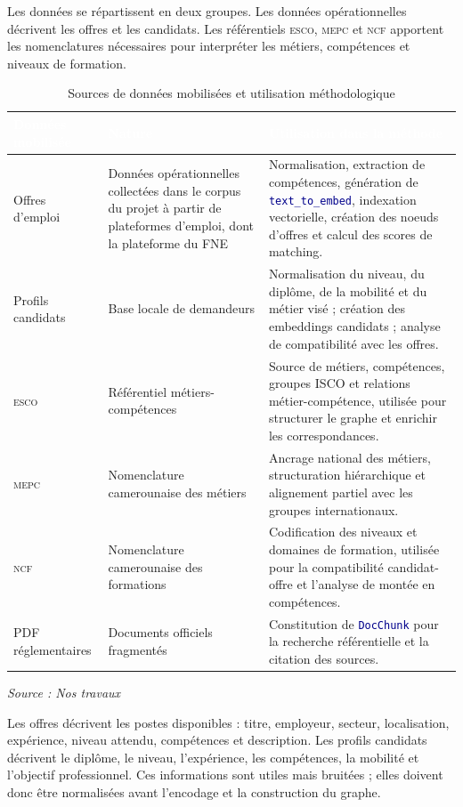 \documentclass[12pt,twoside]{report}
\newcommand{\source}[1]{%
  \par\vspace{0.2\baselineskip}
  {\centering\footnotesize\itshape Source : #1\par}
}
\newcommand{\filevar}[1]{\texttt{\textcolor{darkblue}{#1}}}
\newcommand{\tabheader}[1]{\textcolor{white}{\textbf{#1}}}
\newcommand{\tableStyleStart}{%
  \small
  \renewcommand{\arraystretch}{1.12}%
  \setlength{\tabcolsep}{4pt}%
  \rowcolors{2}{lightblue!12}{white}%
}
\newcommand{\tableStyleEnd}{%
  \rowcolors{2}{}{}%
  \renewcommand{\arraystretch}{1}%
}
\newcommand{\ESCO}{\textsc{esco}}
\newcommand{\MEPC}{\textsc{mepc}}
\newcommand{\NCF}{\textsc{ncf}}
\begin{document}
Les données se répartissent en deux groupes. Les données opérationnelles décrivent les offres et les candidats. Les référentiels \ESCO{}, \MEPC{} et \NCF{} apportent les nomenclatures nécessaires pour interpréter les métiers, compétences et niveaux de formation.
\begin{table}[H]
  \centering
  \caption{Sources de données mobilisées et utilisation méthodologique}
  \label{tab:sources_methodologie_rewrite}
  \tableStyleStart
  \begin{tabularx}{\textwidth}{p{3.0cm}p{3.4cm}X}
    \rowcolor{darkblue}
    \tabheader{Données mobilisée} & \tabheader{Nature} & \tabheader{Utilisation dans la méthode} \\
    \midrule
    Offres d'emploi & Données opérationnelles collectées dans le corpus du projet à partir de plateformes d'emploi, dont la plateforme du FNE & Normalisation, extraction de compétences, génération de \filevar{text\_to\_embed}, indexation vectorielle, création des noeuds d'offres et calcul des scores de matching. \\
    Profils candidats & Base locale de demandeurs & Normalisation du niveau, du diplôme, de la mobilité et du métier visé ; création des embeddings candidats ; analyse de compatibilité avec les offres. \\
    \ESCO{} & Référentiel métiers-compétences & Source de métiers, compétences, groupes ISCO et relations métier-compétence, utilisée pour structurer le graphe et enrichir les correspondances. \\
    \MEPC{} & Nomenclature camerounaise des métiers & Ancrage national des métiers, structuration hiérarchique et alignement partiel avec les groupes internationaux. \\
    \NCF{} & Nomenclature camerounaise des formations & Codification des niveaux et domaines de formation, utilisée pour la compatibilité candidat-offre et l'analyse de montée en compétences. \\
    PDF réglementaires & Documents officiels fragmentés & Constitution de \filevar{DocChunk} pour la recherche référentielle et la citation des sources. \\
    \bottomrule
  \end{tabularx}
  \tableStyleEnd
  \source{Nos travaux}
\end{table}
Les offres décrivent les postes disponibles : titre, employeur, secteur, localisation, expérience, niveau attendu, compétences et description. Les profils candidats décrivent le diplôme, le niveau, l'expérience, les compétences, la mobilité et l'objectif professionnel. Ces informations sont utiles mais bruitées ; elles doivent donc être normalisées avant l'encodage et la construction du graphe.
\end{document}

